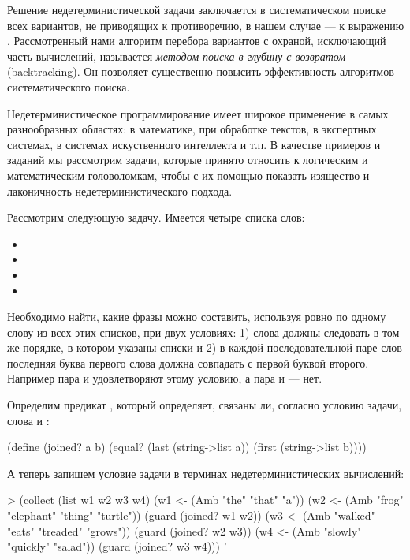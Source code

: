 Решение недетерминистической задачи заключается в систематическом поиске всех вариантов, не приводящих к противоречию, в нашем случае --- к выражению . Рассмотренный нами алгоритм перебора вариантов с охраной, исключающий часть вычислений, называется \emph{методом поиска в глубину с возвратом} (backtracking). Он позволяет существенно повысить эффективность алгоритмов систематического поиска.

Недетерминистическое программирование имеет широкое применение в самых разнообразных областях: в математике, при обработке текстов, в экспертных системах, в системах искуственного интеллекта и т.п. В качестве примеров и заданий мы рассмотрим задачи, которые принято относить к логическим и математическим головоломкам, чтобы с их помощью показать изящество и лаконичность недетерминистического подхода.

Рассмотрим следующую задачу. Имеется четыре списка слов:

\begin{itemize}
  \item {}
  \item {}
  \item {}
  \item {}
\end{itemize}

Необходимо найти, какие фразы можно составить, используя ровно по одному слову из всех этих списков, при двух условиях: 1) слова должны следовать в том же порядке, в котором указаны списки и 2) в каждой последовательной паре слов последняя буква первого слова должна совпадать с первой буквой второго. Например пара  и  удовлетворяют этому условию, а пара  и  --- нет. 

Определим предикат , который определяет, связаны ли, согласно условию задачи, слова  и :
\begin{SchemeCode}[emph={a,b}]
(define (joined? a b)
  (equal? (last (string->list a)) 
          (first (string->list b))))
\end{SchemeCode}

А теперь запишем условие задачи в терминах недетерминистических вычислений:

\begin{SchemeCode}[emph={w1,w2,w3,w4}]
> (collect (list w1 w2 w3 w4)
    (w1 <- (Amb "the" "that" "a"))
    (w2 <- (Amb "frog" "elephant" "thing" "turtle"))
    (guard (joined? w1 w2))
    (w3 <- (Amb "walked" "eats" "treaded" "grows"))
    (guard (joined? w2 w3))
    (w4 <- (Amb "slowly" "quickly" "salad"))
    (guard (joined? w3 w4)))%
'%
\end{SchemeCode}

